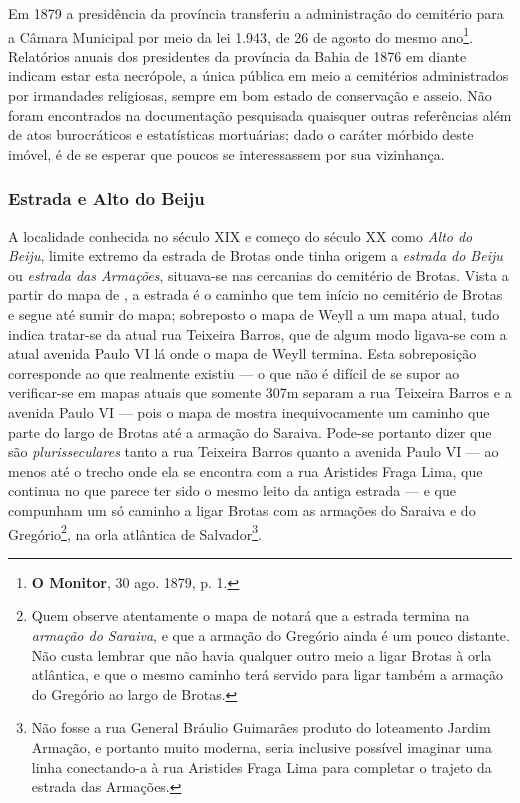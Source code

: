Em 1879 a presidência da província transferiu a administração do cemitério para a Câmara Municipal por meio da lei 1.943, de 26 de agosto do mesmo ano\footnote{\textbf{O Monitor}, 30 ago. 1879, p. 1.}. Relatórios anuais dos presidentes da província da Bahia de 1876 em diante indicam estar esta necrópole, a única pública em meio a cemitérios administrados por irmandades religiosas, sempre em bom estado de conservação e asseio. Não foram encontrados na documentação pesquisada quaisquer outras referências além de atos burocráticos e estatísticas mortuárias; dado o caráter mórbido deste imóvel, é de se esperar que poucos se interessassem por sua vizinhança.

\subsubsection{Estrada e Alto do Beiju}\label{subsubsec:estrbeiju}

A localidade conhecida no século XIX e começo do século XX como \textit{Alto do Beiju}, limite extremo da estrada de Brotas onde tinha origem a \textit{estrada do Beiju} ou \textit{estrada das Armações}, situava-se nas cercanias do cemitério de Brotas. Vista a partir do mapa de , a estrada é o caminho que tem início no cemitério de Brotas e segue até sumir do mapa; sobreposto o mapa de Weyll a um mapa atual, tudo indica tratar-se da atual rua Teixeira Barros, que de algum modo ligava-se com a atual avenida Paulo VI lá onde o mapa de Weyll termina. Esta sobreposição corresponde ao que realmente existiu --- o que não é difícil de se supor ao verificar-se em mapas atuais que somente 307m separam a rua Teixeira Barros e a avenida Paulo VI --- pois o mapa de  mostra inequivocamente um caminho que parte do largo de Brotas até a armação do Saraiva. Pode-se portanto dizer que são \textit{plurisseculares} tanto a rua Teixeira Barros quanto a avenida Paulo VI --- ao menos até o trecho onde ela se encontra com a rua Aristides Fraga Lima, que continua no que parece ter sido o mesmo leito da antiga estrada --- e que compunham um só caminho a ligar Brotas com as armações do Saraiva e do Gregório\footnote{Quem observe atentamente o mapa de  notará que a estrada termina na \textit{armação do Saraiva}, e que a armação do Gregório ainda é um pouco distante. Não custa lembrar que não havia qualquer outro meio a ligar Brotas à orla atlântica, e que o mesmo caminho terá servido para ligar também a armação do Gregório ao largo de Brotas.}, na orla atlântica de Salvador\footnote{Não fosse a rua General Bráulio Guimarães produto do loteamento Jardim Armação, e portanto muito moderna, seria inclusive possível imaginar uma linha conectando-a à rua Aristides Fraga Lima para completar o trajeto da estrada das Armações.}. 

